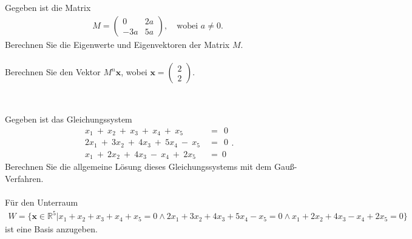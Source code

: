 \subsection*{}
Gegeben ist die Matrix
\begin{align*}
M = 
\begin{pmatrix}
0  & 2a\\
-3a & 5a
\end{pmatrix}
,
\quad
\textrm{wobei } a \neq 0.
\end{align*}
Berechnen Sie die Eigenwerte und Eigenvektoren der Matrix $ M $.\\
\\
Berechnen Sie den Vektor $ M^n \textbf{x} $, wobei $ \textbf{x} = \begin{pmatrix}
2 \\ 2
\end{pmatrix}. $
\\
\\
\subsection*{}
Gegeben ist das Gleichungssystem
\begin{equation*}
\begin{split}
x_1 \ + \  x_2 \ + \  x_3 \ + \  x_4 \ + \ x_5 \ &= \ \ 0 \\
2x_1 \ + \ 3 x_2 \ + \ 4 x_3 \ + \ 5 x_4 \ - \ x_5 \ &= \ \ 0 \\
 x_1 \ + \ 2 x_2 \ + \ 4 x_3 \ - \  x_4 \ + \ 2x_5 \ &= \ 0
\end{split}
.
\end{equation*}
Berechnen Sie die allgemeine Lösung dieses Gleichungssystems mit dem Gauß-Verfahren.\\
\\
Für den Unterraum
\begin{align*}
W 
=
\{
\textbf{x} \in \mathbb{R}^5 | x_1 + x_2 + x_3 + x_4 + x_5 = 0 \wedge
2 x_1 + 3 x_2 +4 x_3 + 5 x_4 - x_5 = 0
\wedge 
x_1 + 2x_2 +4 x_3 - x_4 + 2x_5 = 0
\}
\end{align*}
ist eine Basis anzugeben.
\newpage


